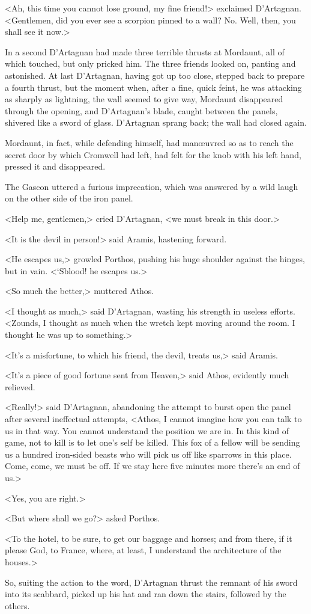 <Ah, this time you cannot lose ground, my fine friend!> exclaimed D'Artagnan. <Gentlemen, did you ever see a scorpion pinned to a wall? No. Well, then, you shall see it now.>

In a second D'Artagnan had made three terrible thrusts at Mordaunt, all of which touched, but only pricked him. The three friends looked on, panting and astonished. At last D'Artagnan, having got up too close, stepped back to prepare a fourth thrust, but the moment when, after a fine, quick feint, he was attacking as sharply as lightning, the wall seemed to give way, Mordaunt disappeared through the opening, and D'Artagnan's blade, caught between the panels, shivered like a sword of glass. D'Artagnan sprang back; the wall had closed again.

Mordaunt, in fact, while defending himself, had manœuvred so as to reach the secret door by which Cromwell had left, had felt for the knob with his left hand, pressed it and disappeared.

The Gascon uttered a furious imprecation, which was answered by a wild laugh on the other side of the iron panel.

<Help me, gentlemen,> cried D'Artagnan, <we must break in this door.>

<It is the devil in person!> said Aramis, hastening forward.

<He escapes us,> growled Porthos, pushing his huge shoulder against the hinges, but in vain. <‘Sblood! he escapes us.>

<So much the better,> muttered Athos.

<I thought as much,> said D'Artagnan, wasting his strength in useless efforts. <Zounds, I thought as much when the wretch kept moving around the room. I thought he was up to something.>

<It's a misfortune, to which his friend, the devil, treats us,> said Aramis.

<It's a piece of good fortune sent from Heaven,> said Athos, evidently much relieved.

<Really!> said D'Artagnan, abandoning the attempt to burst open the panel after several ineffectual attempts, <Athos, I cannot imagine how you can talk to us in that way. You cannot understand the position we are in. In this kind of game, not to kill is to let one's self be killed. This fox of a fellow will be sending us a hundred iron-sided beasts who will pick us off like sparrows in this place. Come, come, we must be off. If we stay here five minutes more there's an end of us.>

<Yes, you are right.>

<But where shall we go?> asked Porthos.

<To the hotel, to be sure, to get our baggage and horses; and from there, if it please God, to France, where, at least, I understand the architecture of the houses.>

So, suiting the action to the word, D'Artagnan thrust the remnant of his sword into its scabbard, picked up his hat and ran down the stairs, followed by the others. 